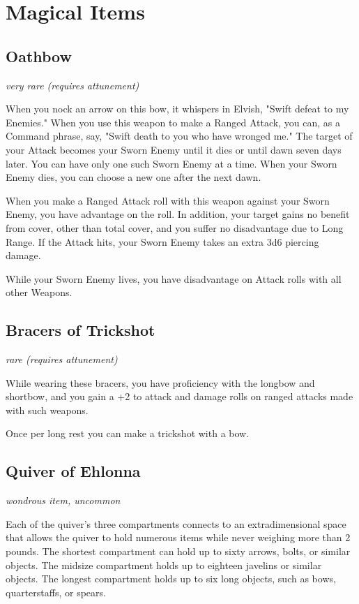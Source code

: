 \documentclass[letterpaper,openany,oneside,twocolumn]{book}
\begin{document}
\section*{Magical Items}
\subsection*{Oathbow}
\textit{very rare (requires attunement)}

When you nock an arrow on this bow, it whispers in Elvish, "Swift defeat to my Enemies." When you use this weapon to make a Ranged Attack, you can, as a Command phrase, say, "Swift death to you who have wronged me." The target of your Attack becomes your Sworn Enemy until it dies or until dawn seven days later. You can have only one such Sworn Enemy at a time. When your Sworn Enemy dies, you can choose a new one after the next dawn.

When you make a Ranged Attack roll with this weapon against your Sworn Enemy, you have advantage on the roll. In addition, your target gains no benefit from cover, other than total cover, and you suffer no disadvantage due to Long Range. If the Attack hits, your Sworn Enemy takes an extra 3d6 piercing damage.

While your Sworn Enemy lives, you have disadvantage on Attack rolls with all other Weapons.

\subsection*{Bracers of Trickshot}
\textit{rare (requires attunement)}

While wearing these bracers, you have proficiency with the longbow and shortbow, and you gain a +2 to attack and damage rolls on ranged attacks made with such weapons.

Once per long rest you can make a trickshot with a bow.

\subsection*{Quiver of Ehlonna}
\textit{wondrous item, uncommon}

Each of the quiver's three compartments connects to an extradimensional space that allows the quiver to hold numerous items while never weighing more than 2 pounds. The shortest compartment can hold up to sixty arrows, bolts, or similar objects. The midsize compartment holds up to eighteen javelins or similar objects. The longest compartment holds up to six long objects, such as bows, quarterstaffs, or spears.
\end{document}
